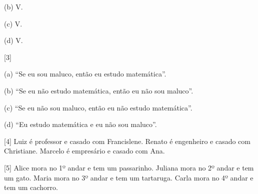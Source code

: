 \documentclass[12pt,a4paper]{article}
\begin{document}
\begin{scriptsize}
(b) V. 

(c) V. 

(d) V.

\vspace{10pt}

[3] 

(a) ``Se eu sou maluco, então eu estudo matemática''.

(b) ``Se eu não estudo matemática, então eu não sou maluco''.

(c) ``Se eu não sou maluco, então eu não estudo matemática''.

(d) ``Eu estudo matemática e eu não sou maluco''.

\vspace{10pt}

[4] Luiz é professor e casado com Francislene. 
Renato é engenheiro e casado com Christiane. 
Marcelo é empresário e casado com Ana.

\vspace{10pt}

[5] 
Alice mora no 1º andar e tem um passarinho. 
Juliana mora no 2º andar e tem um gato. 
Maria mora no 3º andar e tem um tartaruga.  
Carla mora no 4º andar e tem um cachorro. 

\end{scriptsize}
\end{document}
